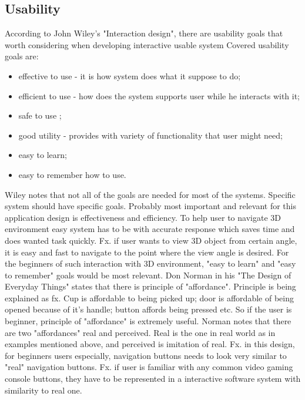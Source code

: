 \subsection{Usability}

According to John Wiley's "Interaction design", there are usability goals that worth considering when developing interactive usable system \cite{Wileys} Covered usability goals are:

\begin{itemize}
\item effective to use - it is how system does what it suppose to do;
\item efficient to use - how does the system supports user while he interacts 	
with it;
\item safe to use ;
\item good utility - provides with variety of functionality that user might need; 
\item easy to learn;
\item easy to remember how to use.
\end{itemize}

Wiley notes that not all of the goals are needed for most of the systems. Specific system should have specific goals. Probably most important and relevant for this application design is effectiveness and efficiency. To help user to navigate 3D environment easy system has to be with accurate response which saves time and does wanted task quickly. Fx. if user wants to view 3D object from certain angle, it is easy and fast to navigate to the point where the view angle is desired. For the beginners of such interaction with 3D environment, "easy to learn" and "easy to remember" goals would be most relevant. Don Norman in his "The Design of Everyday Things" states that there is principle of "affordance". \cite{Normans} Principle is being explained as fx. Cup is affordable to being picked up; door is affordable of being opened because of it’s handle; button affords being pressed etc. So if the user is beginner, principle of "affordance" is extremely useful. Norman notes that there are two "affordances" real and perceived. Real is the one in real world as in examples mentioned above, and perceived is imitation of real. Fx. in this design, for beginners users especially, navigation buttons needs to look very similar to "real" navigation buttons. Fx. if user is familiar with any common video gaming console buttons, they have to be represented in a interactive software system with similarity to real one. 

